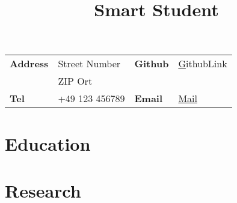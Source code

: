 \documentclass[10pt]{article} %
\begin{document}

\title{Smart Student} %


\begin{tabular}{llll}
{\bf Address} & Street Number \phantom{zimu} &  {\bf Github} & \href{Github}GithubLink\\
  & ZIP Ort & & \\
{\bf Tel} & +49 123 456789 & {\bf Email} & \href{mailto:Mail}{Mail}\\
\end{tabular}


\section{Education}





\section{Research}
\end{document}
